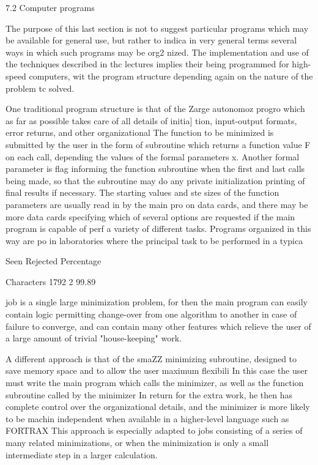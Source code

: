  
7.2  Computer programs
 
     The purpose of this last section is not to suggest particular
programs which may be available for general use, but rather to indica
in very general terms several ways in which such programs may be org2
nized.  The implementation and use of the techniques described in thc
lectures implies their being programmed for high-speed computers, wit
the program structure depending again on the nature of the problem tc
solved.
 
     One traditional program structure is that of the Zarge autonomoz
progro which as far as possible takes care of all details of initia]
tion, input-output formats, error returns, and other organizational
The function to be minimized is submitted by the user in the form of
subroutine which returns a function value F on each call, depending
the values of the formal parameters x.  Another formal parameter is
flag informing the function subroutine when the first and last calls
being made, so that the subroutine may do any private initialization
printing of final results if necessary.  The starting values and ste
sizes of the function parameters are usually read in by the main pro
on data cards, and there may be more data cards specifying which of
several options are requested if the main program is capable of perf
a variety of different tasks.  Programs organized in this way are po
in laboratories where the principal task to be performed in a typica
 
                 Seen Rejected  Percentage
 
Characters       1792        2   99.89
 
 
job is a single large minimization problem, for then the main program
can easily contain logic permitting change-over from one algorithm to
another in case of failure to converge, and can contain many other
features which relieve the user of a large amount of trivial "house-keeping" work.
 
     A different approach is that of the smaZZ minimizing subroutine,
designed to save memory space and to allow the user maximum flexibili
In this case the user must write the main program which calls the
minimizer, as well as the function subroutine called by the minimizer
In return for the extra work, he then has complete control over the
organizational details, and the minimizer is more likely to be machin
independent when available in a higher-level language such as FORTRAX
This approach is especially adapted to jobs consisting of a series of
many related minimizations, or when the minimization is only a small
intermediate step in a larger calculation.
 
